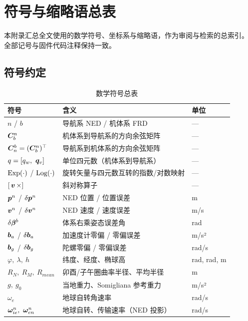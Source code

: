 \section{符号与缩略语总表}
\label{app:notation}

本附录汇总全文使用的数学符号、坐标系与缩略语，作为审阅与检索的总索引。
全部记号与固件代码注释保持一致。

\subsection{符号约定}

\begin{table}[H]
\centering
\caption{数学符号总表}
\label{tab:notation-math}
\small
\begin{tabularx}{\textwidth}{@{}C{2.6cm}L{5.4cm}X@{}}
\toprule
\textbf{符号} & \textbf{含义} & \textbf{单位} \\
\midrule
$n$ / $b$ & 导航系 NED / 机体系 FRD & — \\
$\boldsymbol{C}_b^n$ & 机体系到导航系的方向余弦矩阵 & — \\
$\boldsymbol{C}_n^b = (\boldsymbol{C}_b^n)^{\top}$ & 导航系到机体系的方向余弦矩阵 & — \\
$q = [q_w,\ \boldsymbol{q}_v]$ & 单位四元数（机体系到导航系） & — \\
$\operatorname{Exp}(\cdot)$ / $\operatorname{Log}(\cdot)$ & 旋转矢量与四元数互转的指数/对数映射 & — \\
$[\,\boldsymbol{v}\,\times]$ & 斜对称算子 & — \\
$\boldsymbol{p}^n$ / $\delta\boldsymbol{p}^n$ & NED 位置 / 位置误差 & m \\
$\boldsymbol{v}^n$ / $\delta\boldsymbol{v}^n$ & NED 速度 / 速度误差 & m/s \\
$\delta\boldsymbol{\beta}^b$ & 体系右乘姿态误差角 & rad \\
$\boldsymbol{b}_a$ / $\delta\boldsymbol{b}_a$ & 加速度计零偏 / 零偏误差 & m/s² \\
$\boldsymbol{b}_g$ / $\delta\boldsymbol{b}_g$ & 陀螺零偏 / 零偏误差 & rad/s \\
$\varphi,\ \lambda,\ h$ & 纬度、经度、椭球高 & rad, rad, m \\
$R_N,\ R_M,\ R_{mean}$ & 卯酉/子午圈曲率半径、平均半径 & m \\
$g,\ g_0$ & 当地重力、Somigliana 参考重力 & m/s² \\
$\omega_e$ & 地球自转角速率 & rad/s \\
$\vp{\omega}_{ie}^n,\ \vp{\omega}_{en}^n$ & 地球自转、传输速率（NED 投影） & rad/s \\

\end{tabularx}
\end{table}
